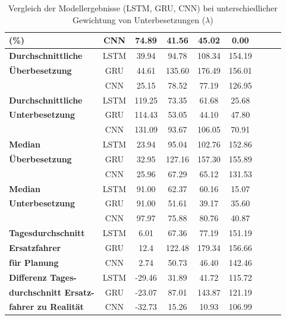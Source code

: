 \documentclass[%
pdftex,
oneside,			%
11pt,				%
parskip=half,		%
headheight = 12pt,	%
headsepline,		%
footsepline,		%
footheight = 16pt,	%
abstracton,		%
DIV=calc,		%
BCOR=8mm,		%
headinclude=false,	%
footinclude=false,	%
listof=totoc,		%
toc=bibliography,	%
]{scrreprt}	%
\begin{document}
\begin{table}[H]
\begin{tabular}{|p{4cm}|c|c|c|c|c|c|c|c|}
            \textbf{(\%)}& CNN & 74.89 & 41.56 & 45.02 & 0.00 \\ \hline
            \textbf{Durchschnittliche} & LSTM & 39.94 & 94.78 & 108.34 & 154.19 \\ \cline{2-6}
            \textbf{Überbesetzung} & GRU & 44.61 & 135.60 & 176.49 & 156.01 \\ \cline{2-6}
            & CNN & 25.15 & 78.52 & 77.19 & 126.95 \\ \hline
            \textbf{Durchschnittliche} & LSTM & 119.25 & 73.35 & 61.68 & 25.68 \\ \cline{2-6}
            \textbf{Unterbesetzung} & GRU & 114.43 & 53.05 & 44.10 & 47.80 \\ \cline{2-6}
            & CNN & 131.09 & 93.67 & 106.05 & 70.91 \\ \hline
            \textbf{Median} & LSTM & 23.94 & 95.04 & 102.76 & 152.86 \\ \cline{2-6}
            \textbf{Überbesetzung} & GRU & 32.95 & 127.16 & 157.30 & 155.89 \\ \cline{2-6}
            & CNN & 25.96 & 67.29 & 65.12 & 131.53 \\ \hline
            \textbf{Median} & LSTM & 91.00 & 62.37 & 60.16 & 15.07 \\ \cline{2-6}
            \textbf{Unterbesetzung} & GRU & 91.00 & 51.61 & 39.17 & 35.60 \\ \cline{2-6}
            & CNN & 97.97 & 75.88 & 80.76 & 40.87 \\ \hline

            \textbf{Tagesdurchschnitt} & LSTM & 6.01 & 67.36 & 77.19 & 151.19 \\ \cline{2-6}
            \textbf{Ersatzfahrer} & GRU & 12.4 & 122.48 & 179.34 & 156.66 \\ \cline{2-6}
            \textbf{für Planung}& CNN & 2.74 & 50.73 & 46.40 & 142.46 \\ \hline
            
            \textbf{Differenz Tages-} & LSTM & -29.46 & 31.89 & 41.72 & 115.72 \\ \cline{2-6}
            \textbf{durchschnitt Ersatz-} & GRU & -23.07 & 87.01 & 143.87 & 121.19 \\ \cline{2-6}
            \textbf{fahrer zu Realität}& CNN & -32.73 & 15.26 & 10.93 & 106.99 \\ \hline            

            \end{tabular}
            \caption{Vergleich der Modellergebnisse (LSTM, GRU, CNN) bei unterschiedlicher Gewichtung von Unterbesetzungen (\( \lambda \))}
            \label{tab:straffaktor_comparison}
        \end{table}
        
\end{document}
